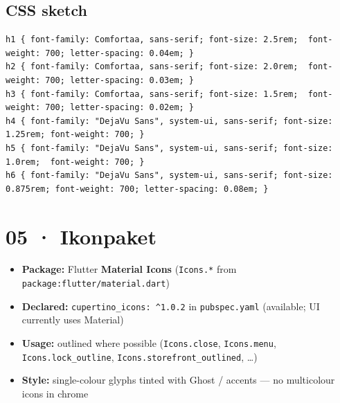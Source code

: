 \documentclass[11pt,a4paper]{article}
\begin{document}
\vspace{0.7em}
\subsection*{CSS sketch}
\begin{verbatim}
h1 { font-family: Comfortaa, sans-serif; font-size: 2.5rem;  font-weight: 700; letter-spacing: 0.04em; }
h2 { font-family: Comfortaa, sans-serif; font-size: 2.0rem;  font-weight: 700; letter-spacing: 0.03em; }
h3 { font-family: Comfortaa, sans-serif; font-size: 1.5rem;  font-weight: 700; letter-spacing: 0.02em; }
h4 { font-family: "DejaVu Sans", system-ui, sans-serif; font-size: 1.25rem; font-weight: 700; }
h5 { font-family: "DejaVu Sans", system-ui, sans-serif; font-size: 1.0rem;  font-weight: 700; }
h6 { font-family: "DejaVu Sans", system-ui, sans-serif; font-size: 0.875rem; font-weight: 700; letter-spacing: 0.08em; }
\end{verbatim}

\clearpage

\section*{05 · Ikonpaket}

\begin{itemize}
  \item \textbf{Package:} Flutter \textbf{Material Icons} (\texttt{Icons.*} from \texttt{package:flutter/material.dart})
  \item \textbf{Declared:} \texttt{cupertino\_icons: \^{}1.0.2} in \texttt{pubspec.yaml} (available; UI currently uses Material)
  \item \textbf{Usage:} outlined where possible (\texttt{Icons.close}, \texttt{Icons.menu}, \texttt{Icons.lock\_outline}, \texttt{Icons.storefront\_outlined}, \ldots)
  \item \textbf{Style:} single-colour glyphs tinted with Ghost / accents — no multicolour icons in chrome
\end{itemize}

\vspace{0.6em}
\end{document}
